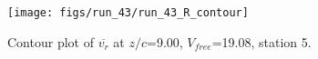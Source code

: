 \begin{figure}[H]
\centering
\texttt{[image: figs/run\_43/run\_43\_R\_contour]}
\caption{Contour plot of $\overline{v_{r}}$ at $z/c$=9.00, $V_{free}$=19.08, station 5.}
\label{fig:run_43_R_contour}
\end{figure}


